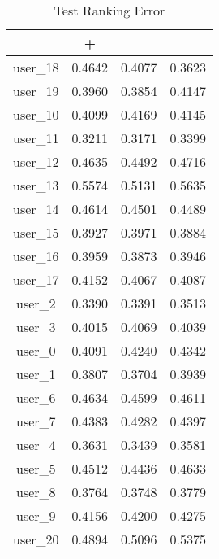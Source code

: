 \begin{table}[ht]\footnotesize
\centering
\caption{Test Ranking Error}
\label{Table:mil_test_error}
\begin{tabular}{|c|c|c|c|}
  \hline
          &\RB{}+  &  \CRB{}  &  \RB{}\\ 
  \hline
user_18  &  0.4642   &  0.4077   &  0.3623 \\ 
user_19  &  0.3960   &  0.3854   &  0.4147 \\ 
user_10  &  0.4099   &  0.4169   &  0.4145 \\ 
user_11  &  0.3211   &  0.3171   &  0.3399 \\ 
user_12  &  0.4635   &  0.4492   &  0.4716 \\ 
user_13  &  0.5574   &  0.5131   &  0.5635 \\ 
user_14  &  0.4614   &  0.4501   &  0.4489 \\ 
user_15  &  0.3927   &  0.3971   &  0.3884 \\ 
user_16  &  0.3959   &  0.3873   &  0.3946 \\ 
user_17  &  0.4152   &  0.4067   &  0.4087 \\ 
user_2  &  0.3390   &  0.3391   &  0.3513 \\ 
user_3  &  0.4015   &  0.4069   &  0.4039 \\ 
user_0  &  0.4091   &  0.4240   &  0.4342 \\ 
user_1  &  0.3807   &  0.3704   &  0.3939 \\ 
user_6  &  0.4634   &  0.4599   &  0.4611 \\ 
user_7  &  0.4383   &  0.4282   &  0.4397 \\ 
user_4  &  0.3631   &  0.3439   &  0.3581 \\ 
user_5  &  0.4512   &  0.4436   &  0.4633 \\ 
user_8  &  0.3764   &  0.3748   &  0.3779 \\ 
user_9  &  0.4156   &  0.4200   &  0.4275 \\ 
user_20  &  0.4894   &  0.5096   &  0.5375 \\ 
\hline
 \end{tabular}
  \end{table}



